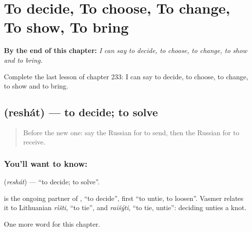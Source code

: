 
\chapter{To decide, To choose, To change, To show, To bring}
\label{ch:ru-to-decide-to-choose-to-change-to-show-to-bring}

\begin{chapteropening}
\textbf{By the end of this chapter:} \emph{I can say to decide, to choose, to change, to show and to bring.}

Complete the last lesson of chapter 233: I can say to decide, to choose, to change, to show and to bring.
\end{chapteropening}

\section[\texorpdfstring{\ru{решать} (reshát)}{решать (reshát)}]{ (reshát) — to decide; to solve}

\label{lesson:RU-C233-reshat}



\begin{quote}
Before the new one: say the Russian for to send, then the Russian for to receive.
\end{quote}

\subsection*{You'll want to know: }
\textbf{} (\emph{reshát}) — \textquotedblleft{}to decide; to solve\textquotedblright{}.

\begin{cousinweb}
\textbf{} is the ongoing partner of \emph{}, \textquotedblleft{}to decide\textquotedblright{}, first \textquotedblleft{}to untie, to loosen\textquotedblright{}. Vasmer relates it to Lithuanian \emph{rìšti}, \textquotedblleft{}to tie\textquotedblright{}, and \emph{raišýti}, \textquotedblleft{}to tie, untie\textquotedblright{}: deciding unties a knot.
\end{cousinweb}

\begin{grammarlens}[title={What you've built}]
One more word for this chapter.
\end{grammarlens}

